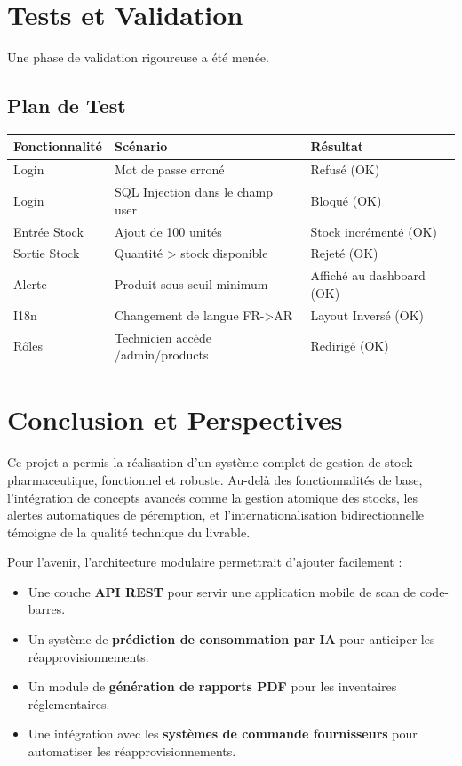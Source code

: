 \documentclass[12pt, a4paper]{report}
\begin{document}
\chapter{Tests et Validation}
Une phase de validation rigoureuse a été menée.

\section{Plan de Test}
\begin{longtable}{|l|p{6cm}|l|}
\hline
\textbf{Fonctionnalité} & \textbf{Scénario} & \textbf{Résultat} \\
\hline
Login & Mot de passe erroné & Refusé (OK) \\
\hline
Login & SQL Injection dans le champ user & Bloqué (OK) \\
\hline
Entrée Stock & Ajout de 100 unités & Stock incrémenté (OK) \\
\hline
Sortie Stock & Quantité > stock disponible & Rejeté (OK) \\
\hline
Alerte & Produit sous seuil minimum & Affiché au dashboard (OK) \\
\hline
I18n & Changement de langue FR->AR & Layout Inversé (OK) \\
\hline
Rôles & Technicien accède /admin/products & Redirigé (OK) \\
\hline
\end{longtable}

\chapter{Conclusion et Perspectives}
Ce projet a permis la réalisation d'un système complet de gestion de stock pharmaceutique, fonctionnel et robuste. Au-delà des fonctionnalités de base, l'intégration de concepts avancés comme la gestion atomique des stocks, les alertes automatiques de péremption, et l'internationalisation bidirectionnelle témoigne de la qualité technique du livrable.

Pour l'avenir, l'architecture modulaire permettrait d'ajouter facilement :
\begin{itemize}
    \item Une couche \textbf{API REST} pour servir une application mobile de scan de code-barres.
    \item Un système de \textbf{prédiction de consommation par IA} pour anticiper les réapprovisionnements.
    \item Un module de \textbf{génération de rapports PDF} pour les inventaires réglementaires.
    \item Une intégration avec les \textbf{systèmes de commande fournisseurs} pour automatiser les réapprovisionnements.
\end{itemize}
\end{document}
